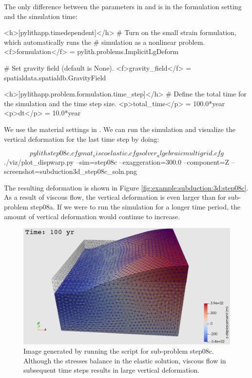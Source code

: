 The only difference between the parameters in 
and  is in the formulation setting and the
simulation time:
\begin{cfg}
<h>[pylithapp.timedependent]</h>
# Turn on the small strain formulation, which automatically runs the
# simulation as a nonlinear problem.
<f>formulation</f> = pylith.problems.ImplicitLgDeform

# Set gravity field (default is None).
<f>gravity_field</f> = spatialdata.spatialdb.GravityField

<h>[pylithapp.problem.formulation.time_step]</h>
# Define the total time for the simulation and the time step size.
<p>total_time</p> = 100.0*year
<p>dt</p> = 10.0*year
\end{cfg}
We use the material settings in . We
can run the simulation and visualize the vertical deformation for the
last time step by doing:
\begin{shell}
$$ pylith step08c.cfg mat_viscoelastic.cfg solver_algebraicmultigrid.cfg
$$ ./viz/plot_dispwarp.py --sim=step08c --exaggeration=300.0
--component=Z --screenshot=subduction3d_step08c_soln.png
\end{shell}
The resulting deformation is shown in Figure
\vref{fig:example:subduction:3d:step08c}. As a result of viscous flow,
the vertical deformation is even larger than for sub-problem
step08a. If we were to run the simulation for a longer time period,
the amount of vertical deformation would continue to increase.
\begin{figure}
  \includegraphics[width=4.5in]{examples/figs/subduction3d_step08c_soln}
  \caption{Image generated by running the 
    script for sub-problem step08c. Although the stresses balance in
    the elastic solution, viscous flow in subsequent time steps
    results in large vertical deformation.}
  \label{fig:example:subduction:3d:step08c}
\end{figure}

